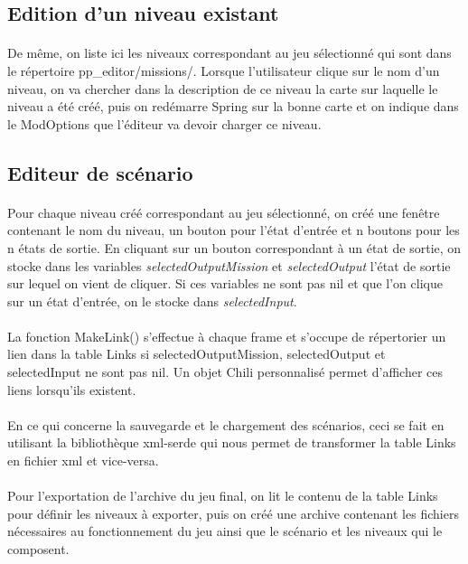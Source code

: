 \documentclass[a4paper]{article}
\begin{document}
\subsection{Edition d'un niveau existant}
\paragraph{}
De même, on liste ici les niveaux correspondant au jeu sélectionné qui sont dans le répertoire pp\_editor/missions/. Lorsque l'utilisateur clique sur le nom d'un niveau, on va chercher dans la description de ce niveau la carte sur laquelle le niveau a été créé, puis on redémarre Spring sur la bonne carte et on indique dans le ModOptions que l'éditeur va devoir charger ce niveau.
\subsection{Editeur de scénario}
\paragraph{}
Pour chaque niveau créé correspondant au jeu sélectionné, on créé une fenêtre contenant le nom du niveau, un bouton pour l'état d'entrée et n boutons pour les n états de sortie. En cliquant sur un bouton correspondant à un état de sortie, on stocke dans les variables \textit{selectedOutputMission} et \textit{selectedOutput} l'état de sortie sur lequel on vient de cliquer. Si ces variables ne sont pas nil et que l'on clique sur un état d'entrée, on le stocke dans \textit{selectedInput}.
\paragraph{}
La fonction MakeLink() s'effectue à chaque frame et s'occupe de répertorier un lien dans la table Links si selectedOutputMission, selectedOutput et selectedInput ne sont pas nil. Un objet Chili personnalisé permet d'afficher ces liens lorsqu'ils existent.
\paragraph{}
En ce qui concerne la sauvegarde et le chargement des scénarios, ceci se fait en utilisant la bibliothèque xml-serde qui nous permet de transformer la table Links en fichier xml et vice-versa.
\paragraph{}
Pour l'exportation de l'archive du jeu final, on lit le contenu de la table Links pour définir les niveaux à exporter, puis on créé une archive contenant les fichiers nécessaires au fonctionnement du jeu ainsi que le scénario et les niveaux qui le composent.
\end{document}
